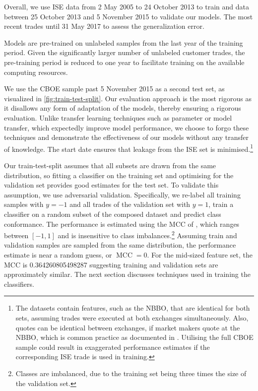 Overall, we use \gls{ISE} data from 2 May 2005 to 24 October 2013 to train and data between 25 October 2013 and 5 November 2015 to validate our models. The most recent trades until 31 May 2017 to assess the generalization error.

Models are pre-trained on unlabeled samples from the last year of the training period. Given the significantly larger number of unlabeled customer trades, the pre-training period is reduced to one year to facilitate training on the available computing resources.

We use the \gls{CBOE} sample past 5 November 2015 as a second test set, as visualized in \cref{fig:train-test-split}. Our evaluation approach is the most rigorous as it disallows any form of adaptation of the models, thereby ensuring a rigorous evaluation. Unlike transfer learning techniques such as parameter or model transfer, which expectedly improve model performance, we choose to forgo these techniques and demonstrate the effectiveness of our models without any transfer of knowledge. The start date ensures that leakage from the \gls{ISE} set is minimised.\footnote{The datasets contain features, such as the \gls{NBBO}, that are identical for both sets, assuming trades were executed at both exchanges simultaneously. Also, quotes can be identical between exchanges, if market makers quote at the \gls{NBBO}, which is common practice as documented in \textcite[10]{securitiesandexchangecommissionReportConcerningExaminations2007}. Utilising the full \gls{CBOE} sample could result in exaggerated performance estimates if the corresponding \gls{ISE} trade is used in training.}

Our train-test-split assumes that all subsets are drawn from the same distribution, so fitting a classifier on the training set and optimising for the validation set provides good estimates for the test set. To validate this assumption, we use adversarial validation. Specifically, we re-label all training samples with $y=-1$ and all trades of the validation set with $y=1$, train a classifier on a random subset of the composed dataset and predict class conformance. The performance is estimated using the \gls{MCC} of \textcite[][445]{matthewsComparisonPredictedObserved1975}, which ranges between $\left[-1, 1\right]$ and is insensitive to class imbalances.\footnote{Classes are imbalanced, due to the training set being three times the size of the validation set.} Assuming train and validation samples are sampled from the same distribution, the performance estimate is near a random guess, or $\operatorname{MCC} = 0$. For the mid-sized feature set, the \gls{MCC} is \num{0.364260805498287} suggesting training and validation sets are approximately similar. The next section discusses techniques used in training the classifiers.